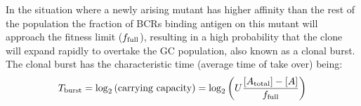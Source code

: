 In the situation where a newly arising mutant has higher affinity than the rest of the population the fraction of BCRs binding antigen on this mutant will approach the fitness limit ($f_{\text{full}}$), resulting in a high probability that the clone will expand rapidly to overtake the GC population, also known as a clonal burst.
The clonal burst has the characteristic time (average time of take over) being:
$$
T_{\text{burst}} = \log_2 \left(\text{carrying capacity} \right) = \log_2\left( U \frac{[A_{\text{total}}] - [A]}{f_{\text{full}}} \right)
$$






